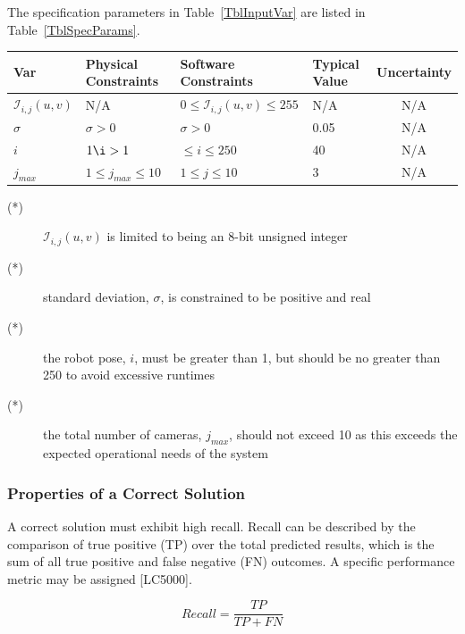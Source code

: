 \documentclass[12pt]{article}
\begin{document}
The specification parameters in Table~\ref{TblInputVar} are listed in
Table~\ref{TblSpecParams}.

\begin{table}[!h]
  \caption{Input Variables} \label{TblInputVar}
  \renewcommand{\arraystretch}{1.2}
\noindent \begin{longtable*}{l l l l c} 
  \toprule
  \textbf{Var} & \textbf{Physical Constraints} & \textbf{Software Constraints} &
                             \textbf{Typical Value} & \textbf{Uncertainty}\\
  \midrule 
  $\mathit{\mathcal{I}_{i, j}(u,v)}$ & N/A & $0 \leq \mathit{\mathcal{I}_{i, j}(u,v)} \leq 255$ 
  & N/A & N/A  %
  \\
  $\sigma$ & $\sigma > 0$ & $\sigma > 0 $ & 0.05 & N/A %
  \\
  $i$ & $ 1 \i > 1$ & $\leq i \leq 250$ & 40 & N/A
  \\
  $j_{max}$ & $1 \leq j_{max} \leq 10$ & $1 \leq j \leq 10$ & 3 & N/A
  \\
  \bottomrule
\end{longtable*}
\end{table}
\noindent 
\begin{description}
\item[(*)] $\mathit{\mathcal{I}_{i, j}(u,v)}$ is limited to being an 8-bit unsigned integer
\item[(*)] standard deviation, $\sigma$, is constrained to be positive and real
\item[(*)] the robot pose, $i$, must be greater than 1, but should be no greater than 250 
to avoid excessive runtimes
\item[(*)] the total number of cameras, $j_{max}$, should not exceed 10 as this exceeds the 
expected operational needs of the system
\end{description}

\subsubsection{Properties of a Correct Solution} \label{sec_CorrectSolution}

\noindent
A correct solution must exhibit high recall. Recall can be described by the comparison of true positive (TP) over the 
total predicted results, which is the sum of all true positive and false negative (FN) outcomes. A specific performance metric 
may be assigned [LC5000].

$$Recall = \frac{TP}{TP + FN}$$
\end{document}
